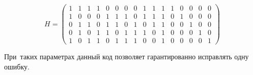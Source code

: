 \begin{equation}
H =
\begin{pmatrix}
1 & 1 & 1 & 1 & 0 & 0 & 0 & 0 & 1 & 1 & 1 & 1 & 0 & 0 & 0 & 0 \\
1 & 0 & 0 & 0 & 1 & 1 & 1 & 0 & 1 & 1 & 1 & 0 & 1 & 0 & 0 & 0 \\
0 & 1 & 1 & 0 & 1 & 1 & 0 & 1 & 0 & 1 & 1 & 0 & 0 & 1 & 0 & 0 \\
0 & 1 & 0 & 1 & 1 & 0 & 1 & 1 & 1 & 0 & 1 & 0 & 0 & 0 & 1 & 0 \\
1 & 0 & 1 & 1 & 0 & 1 & 1 & 1 & 0 & 0 & 1 & 0 & 0 & 0 & 0 & 1
\end{pmatrix}
\end{equation}

При~таких параметрах данный код позволяет гарантированно исправлять одну ошибку.

